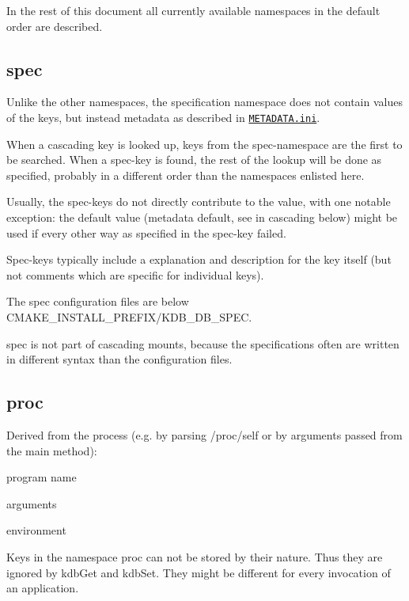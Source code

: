 In the rest of this document all currently available namespaces in the default order are described.

\subsection*{spec}

Unlike the other namespaces, the specification namespace does not contain values of the keys, but instead metadata as described in \href{/home/markus/Projekte/Elektra/current/doc/METADATA.ini}{\tt M\+E\+T\+A\+D\+A\+T\+A.\+ini}.

When a cascading key is looked up, keys from the spec-\/namespace are the first to be searched. When a spec-\/key is found, the rest of the lookup will be done as specified, probably in a different order than the namespaces enlisted here.

Usually, the spec-\/keys do not directly contribute to the value, with one notable exception\+: the default value (metadata {\ttfamily default}, see in cascading below) might be used if every other way as specified in the spec-\/key failed.

Spec-\/keys typically include a explanation and description for the key itself (but not comments which are specific for individual keys).

The spec configuration files are below {\ttfamily C\+M\+A\+K\+E\+\_\+\+I\+N\+S\+T\+A\+L\+L\+\_\+\+P\+R\+E\+F\+I\+X/\+K\+D\+B\+\_\+\+D\+B\+\_\+\+S\+P\+E\+C}.

spec is not part of cascading mounts, because the specifications often are written in different syntax than the configuration files.

\subsection*{proc}

Derived from the process (e.\+g. by parsing /proc/self or by arguments passed from the main method)\+:


\begin{DoxyItemize}
\item program name
\item arguments
\item environment
\end{DoxyItemize}

Keys in the namespace proc can not be stored by their nature. Thus they are ignored by {\ttfamily kdb\+Get} and {\ttfamily kdb\+Set}. They might be different for every invocation of an application.

